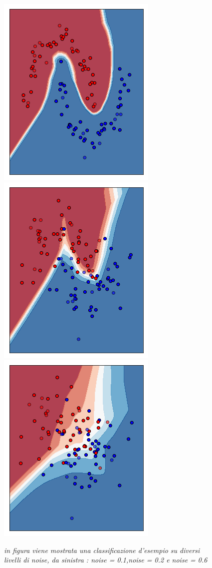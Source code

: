 \documentclass[12pt,a4paper]{report}
\begin{document}
\begin{figure}[H]
\centering
 \includegraphics[scale = 0.4]{images/moons-noise0,1}
 \includegraphics[scale = 0.4]{images/moons-noise0,3}
 \includegraphics[scale = 0.4]{images/moons-noise0,6}
 \caption{\textit{in figura viene mostrata una classificazione d'esempio su diversi livelli di noise, da sinistra : noise = 0.1,noise = 0.2 e noise = 0.6}}
 \label{exnoisemoons}
\end{figure}
\end{document}
